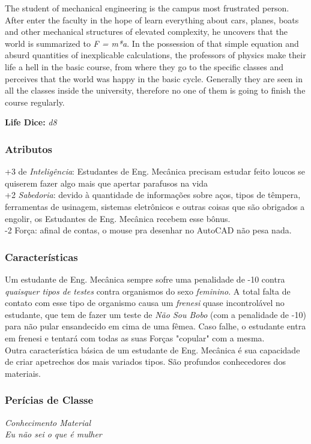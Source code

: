 \documentclass[ letterpaper,12pt]{article}
\begin{document}
The student of mechanical engineering is the campus most frustrated person. After enter the faculty in the hope of learn everything about cars, planes, boats and other mechanical structures of elevated complexity, he uncovers that the world is summarized to {\it F = m*a}. In the possession of that simple equation and absurd quantities of inexplicable calculations, the professors of physics make their life a hell in the basic course, from where they go to the specific classes and perceives that the world was happy in the basic cycle. Generally they are seen in all the classes inside the university, therefore no one of them is going to finish the course regularly. 

{\bf Life Dice: } {\it d8}

\subsubsection{Atributos}
+3 de {\it Inteligência}: Estudantes de Eng. Mecânica precisam estudar feito loucos se quiserem fazer algo mais que apertar parafusos na vida\\
+2 {\it Sabedoria}: devido à quantidade de informações sobre aços, tipos de têmpera, ferramentas de usinagem, sistemas eletrônicos e outras coisas que são obrigados a engolir, os Estudantes de Eng. Mecânica recebem esse bônus.\\
-2 Força: afinal de contas, o mouse pra desenhar no AutoCAD não pesa nada.\\


\subsubsection{Características}
Um estudante de Eng. Mecânica sempre sofre uma penalidade de -10 contra {\it quaisquer tipos de testes} contra organismos do sexo {\it feminino}. A total falta de contato com esse tipo de organismo causa um {\it frenesi} quase incontrolável no estudante, que tem de fazer um teste de {\it Não Sou Bobo} (com a penalidade de -10) para não pular ensandecido em cima de uma fêmea. Caso falhe, o estudante entra em frenesi e tentará com todas as suas Forças "copular" com a mesma.\\
Outra característica básica de um estudante de Eng. Mecânica é sua capacidade de criar apetrechos dos mais variados tipos. São profundos conhecedores dos materiais.\\

\subsubsection{Perícias de Classe}
{\it Conhecimento Material\\
Eu não sei o que é mulher}\\
\end{document}
